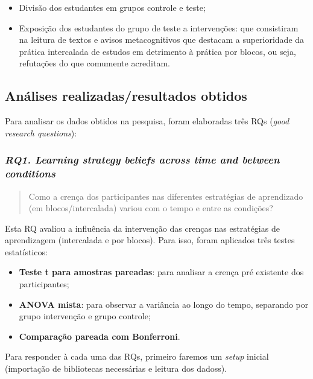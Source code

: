 \documentclass[
]{article}
\begin{document}
\begin{itemize}
\item
  Divisão dos estudantes em grupos controle e teste;
\item
  Exposição dos estudantes do grupo de teste a intervenções: que
  consistiram na leitura de textos e avisos metacognitivos que destacam
  a superioridade da prática intercalada de estudos em detrimento à
  prática por blocos, ou seja, refutações do que comumente acreditam.
\end{itemize}

\subsection{Análises realizadas/resultados
obtidos}\label{anuxe1lises-realizadasresultados-obtidos}

Para analisar os dados obtidos na pesquisa, foram elaboradas três RQs
(\emph{good research questions}):

\subsubsection{\texorpdfstring{\emph{RQ1. Learning strategy beliefs
across time and between
conditions}}{RQ1. Learning strategy beliefs across time and between conditions}}\label{rq1.-learning-strategy-beliefs-across-time-and-between-conditions}

\begin{quote}
Como a crença dos participantes nas diferentes estratégias de
aprendizado (em blocos/intercalada) variou com o tempo e entre as
condições?
\end{quote}

Esta RQ avaliou a influência da intervenção das crenças nas estratégias
de aprendizagem (intercalada e por blocos). Para isso, foram aplicados
três testes estatísticos:

\begin{itemize}
\item
  \textbf{Teste t para amostras pareadas}: para analisar a crença pré
  existente dos participantes;
\item
  \textbf{ANOVA mista}: para observar a variância ao longo do tempo,
  separando por grupo intervenção e grupo controle;
\item
  \textbf{Comparação pareada com Bonferroni}.
\end{itemize}

Para responder à cada uma das RQs, primeiro faremos um \emph{setup}
inicial (importação de bibliotecas necessárias e leitura dos dadoss).
\end{document}
